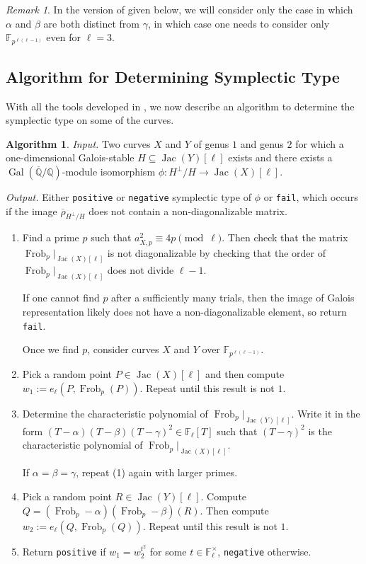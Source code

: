\documentclass{amsproc}
\numberwithin{equation}{section}
\theoremstyle{definition}
\newtheorem{algorithm}[equation]{Algorithm}
\theoremstyle{remark}
\newtheorem{remark}[equation]{Remark}
\DeclareMathOperator{\Jac}{Jac}
\DeclareMathOperator{\Frob}{Frob}
\DeclareMathOperator{\Gal}{Gal}
\newcommand{\QQ}{\mathbb Q}
\newcommand{\FF}{\mathbb F}
\newcommand{\Qbar}{\overline{\QQ}}
\newcommand{\GalQ}{\Gal(\Qbar/\QQ)}
\newcommand{\rhoHperpH}{\overline\rho_{H^\perp\!/H}}
\begin{document}
\begin{remark}
    In the version of  given below, we will consider only the case in which $\alpha$ and $\beta$ are both distinct from $\gamma$, in which case one needs to consider only $\FF_{p^{\ell(\ell-1)}}$ even for $\ell=3$.
\end{remark}
\subsection{Algorithm for Determining Symplectic Type}
With all the tools developed in , we now describe an algorithm to determine the symplectic type on some of the curves.
\begin{algorithm}
\label{alg:symplectic}
\emph{Input.} Two curves $X$ and $Y$ of genus $1$ and genus $2$ for which a one-dimensional Galois-stable $H\subseteq\Jac(Y)[\ell]$ exists and there exists a $\GalQ$-module isomorphism $\phi : H^\perp/H \to \Jac(X)[\ell]$.

\emph{Output.} Either \texttt{positive} or \texttt{negative} symplectic type of $\phi$ or \texttt{fail}, which occurs if the image $\rhoHperpH$ does not contain a non-diagonalizable matrix.

\begin{enumerate}
    \item Find a prime $p$ such that $a_{X,p}^2 \equiv 4p\pmod\ell$. Then check that the matrix $\Frob_p|_{\Jac(X)[\ell]}$ is not diagonalizable by checking that the order of $\Frob_p|_{\Jac(X)[\ell]}$ does not divide $\ell-1$.

    If one cannot find $p$ after a sufficiently many trials, then the image of Galois representation likely does not have a non-diagonalizable element, so return \texttt{fail}.

    Once we find $p$, consider curves $X$ and $Y$ over $\FF_{p^{\ell(\ell-1)}}$.
    \item Pick a random point $P\in\Jac(X)[\ell]$ and then compute $w_1 := e_\ell(P, \Frob_p(P))$. Repeat until this result is not $1$.
    \item Determine the characteristic polynomial of $\Frob_p | _{\Jac(Y)[\ell]}$. Write it in the form $(T-\alpha)(T-\beta)(T-\gamma)^2\in\FF_\ell[T]$ such that $(T-\gamma)^2$ is the characteristic polynomial of $\Frob_p  |_{\Jac(X)[\ell]}$.

    If $\alpha=\beta=\gamma$, repeat (1) again with larger primes.
    \item Pick a random point $R\in\Jac(Y)[\ell]$. Compute $Q = (\Frob_p-\alpha)(\Frob_p-\beta)(R)$. Then compute $w_2 := e_\ell(Q,\Frob_p(Q))$. Repeat until this result is not $1$.
    \item Return \texttt{positive} if $w_1 = w_2^{t^2}$ for some $t\in\FF_\ell^\times$, \texttt{negative} otherwise.
\end{enumerate}
\end{algorithm}
\end{document}

